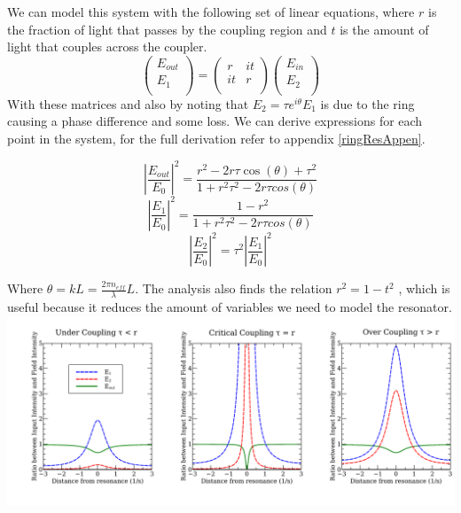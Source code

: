 We can model this system with the following set of linear equations, where $r$ is the fraction of light that passes by the coupling region and $t$ is the amount of light that couples across the coupler.
\begin{equation}
\begin{pmatrix}
E_{out} \\
E_{1} \\
\end{pmatrix}
=
\begin{pmatrix}
r & it \\
it & r \\
\end{pmatrix}
\begin{pmatrix}
E_{in} \\
E_{2} \\
\end{pmatrix}
\end{equation}
\noindent
With these matrices and also by noting that $E_2=\tau e^{i\theta}E_1$ is due to the ring causing a phase difference and some loss. We can derive expressions for each point in the system, for the full derivation refer to appendix \ref{ringResAppen}.

\begin{equation}
\left |\frac{E_{out}}{E_{0}}\right|^2=\frac{r^2-2r\tau\cos(\theta)+\tau^2}{1+r^2\tau^2-2r\tau cos(\theta)}
\end{equation}
\begin{equation}
\left|\frac{E_{1}}{E_{0}}\right |^2=\frac{1-r^2}{1+r^2\tau^2-2r\tau cos(\theta)}
\end{equation}
\begin{equation}
\left |\frac{E_{2}}{E_{0}}\right |^2=\tau^2\left|\frac{E_{1}}{E_{0}}\right |^2
\end{equation}

Where $\theta=kL=\frac{2\pi n_{eff}}{\lambda}L$. The analysis also finds the relation $r^2 = 1 - t^2$ , which is useful because it reduces the amount of variables we need to model the resonator.
\begingroup
    \centering  
    \includegraphics[width=17cm]{img/theory/coupling.pdf}
     \vspace{3pt} \label{coupling}
\endgroup

